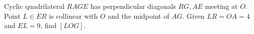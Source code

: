 Cyclic quadrilateral $RAGE$ has perpendicular diagonals $RG,AE$ meeting at $O$. Point $L\in ER$ is collinear with $O$ and the midpoint of $AG$. Given $LR=OA=4$ and $EL=9$, find $[LOG]$.
